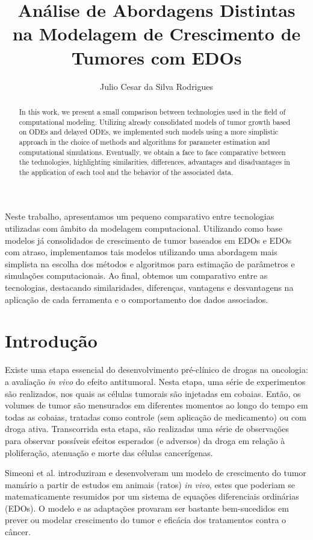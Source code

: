 \documentclass[12pt]{article}
\title{Análise de Abordagens Distintas na Modelagem de Crescimento de Tumores com EDOs}
\author{Julio Cesar da Silva Rodrigues\inst{1}}
\begin{document}
 

\maketitle

\begin{abstract}
    In this work, we present a small comparison between technologies used in the field of computational modeling. Utilizing already consolidated models of tumor growth based on ODEs and delayed ODEs, we implemented such models using a more simplistic approach in the choice of methods and algorithms for parameter estimation and computational simulations. Eventually, we obtain a face to face comparative between the technologies, highlighting similarities, differences, advantages and disadvantages in the application of each tool and the behavior of the associated data.
\end{abstract}

\begin{resumo} 
    Neste trabalho, apresentamos um pequeno comparativo entre tecnologias utilizadas com âmbito da modelagem computacional. Utilizando como base modelos já consolidados de crescimento de tumor baseados em EDOs e EDOs com atraso, implementamos tais modelos utilizando uma abordagem mais simplista na escolha dos métodos e algoritmos para estimação de parâmetros e simulações computacionais. Ao final, obtemos um comparativo entre as tecnologias, destacando similaridades, diferenças, vantagens e desvantagens na aplicação de cada ferramenta e o comportamento dos dados associados.
\end{resumo}

\section{Introdução}

Existe uma etapa essencial do desenvolvimento pré-clínico de drogas na oncologia: a avaliação \emph{in vivo} do efeito antitumoral. Nesta etapa, uma série de experimentos são realizados, nos quais as células tumorais são injetadas em cobaias. Então, os volumes de tumor são mensurados em diferentes momentos ao longo do tempo em todas as cobaias, tratadas como controle (sem aplicação de medicamento) ou com droga ativa. Transcorrida esta etapa, são realizadas uma série de observações para observar possíveis efeitos esperados (e adversos) da droga em relação à ploliferação, atenuação e morte das células cancerígenas.

Simeoni et al. \cite{tu} introduziram e desenvolveram um modelo de crescimento do tumor mamário a partir de estudos em animais (ratos) \emph{in vivo}, estes que poderiam se matematicamente resumidos por um sistema de equações diferenciais ordinárias (EDOs). O modelo e as adaptações provaram ser bastante bem-sucedidos em prever ou modelar crescimento do tumor e eficácia dos tratamentos contra o câncer.
\end{document}

